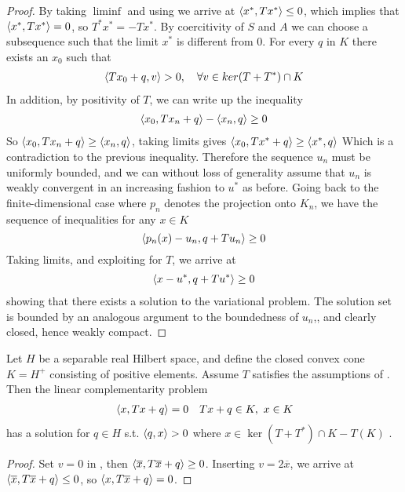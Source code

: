 \begin{proof}
By taking $\liminf$ and using  we arrive at $\left \langle x^*,Tx^* \right \rangle \leq 0$, which implies that $\left \langle x^*,Tx^* \right \rangle=0$, so $T^*x^* = - Tx^*$. By coercitivity of $S$ and $A$ we can choose a subsequence such that the limit $x^*$ is different from 0. For every $q$ in $K$ there exists an $x_0$ such that
\begin{align*}
	\left \langle Tx_0+q,v \right \rangle > 0, \quad \forall v \in ker(T+T^*)\cap K
\end{align*}
In addition, by positivity of $T$, we can write up the inequality
\begin{align*}
	\left \langle x_0,Tx_n + q \right \rangle - \left \langle x_n,q \right \rangle \geq 0
\end{align*}
So $\left \langle x_0,Tx_n+q \right \rangle \geq \left \langle x_n,q \right \rangle$, taking limits gives $\left \langle x_0,Tx^*+q \right \rangle \geq \left \langle x^*,q \right \rangle$
Which is a contradiction to the previous inequality. Therefore the sequence $u_n$ must be uniformly bounded, and we can without loss of generality assume that $u_n$ is weakly convergent in an increasing fashion to $u^*$ as before.
Going back to the finite-dimensional case where $p_n$ denotes the projection onto $K_n$, we have the sequence of inequalities for any $x \in K$
\begin{equation}
	\left \langle p_n(x) - u_n,q+Tu_n \right \rangle \geq 0
\end{equation}
Taking limits, and exploiting  for $T$, we arrive at
\begin{align*}
	\left \langle x - u^*,q+Tu^* \right \rangle \geq 0
\end{align*}
showing that there exists a solution to the variational problem. The solution set is bounded by an analogous argument to the boundedness of $u_n$,, and clearly closed, hence weakly compact.
\end{proof}\begin{corollary}
  \label{cor:lcp_formulation}
  Let $H$ be a separable real Hilbert space, and define the closed convex cone $K=H^+$ consisting of positive elements. Assume $T$ satisfies the assumptions of . Then the linear complementarity problem
  \begin{align*}
    &\left \langle x,Tx+q \right \rangle = 0
    &Tx+q \in K, ~x \in K
  \end{align*}
  has a solution for $q \in H$ s.t. $\left \langle q,x \right \rangle > 0$ where $x\in \ker(T+T^*) \cap K - T(K)$ .
\end{corollary}
\begin{proof}
  Set $v=0$ in , then $\left \langle \overline{x},T\overline{x} + q \right \rangle \geq 0$. Inserting $v=2\overline{x}$, we arrive at
  $\left \langle \overline{x},T\overline{x}+q \right \rangle\leq 0$, so $\left \langle x,T\overline{x}+q \right \rangle = 0$.
\end{proof}
